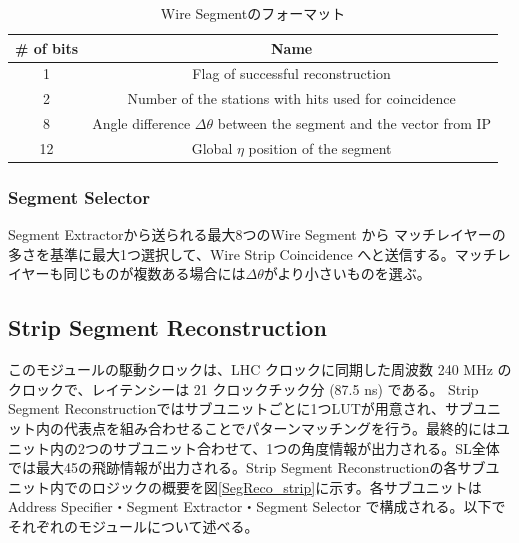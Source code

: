 \begin{table}[h]
    \centering
    \caption{Wire Segmentのフォーマット}
    \label{tab:WireSegment}
    \begin{tabular}{|c|c|}
    \hline
    \# of bits & Name                                                                       \\ \hline\hline
    1          & Flag of successful reconstruction                                          \\ \hline
    2          & Number of the stations with hits used for coincidence                      \\ \hline
    8          & Angle difference $\Delta\theta$ between the segment and the vector from IP \\ \hline
    12         & Global $\eta$ position of the segment                                      \\ \hline
    \end{tabular}
\end{table}

\subsubsection*{Segment Selector}
Segment Extractorから送られる最大8つのWire Segment から マッチレイヤーの多さを基準に最大1つ選択して、Wire Strip Coincidence へと送信する。マッチレイヤーも同じものが複数ある場合には$\Delta\theta$がより小さいものを選ぶ。

\subsection*{Strip Segment Reconstruction}
このモジュールの駆動クロックは、LHC クロックに同期した周波数 240 MHz のクロックで、レイテンシーは 21 クロックチック分 (87.5 ns) である。
Strip Segment Reconstructionではサブユニットごとに1つLUTが用意され、サブユニット内の代表点を組み合わせることでパターンマッチングを行う。最終的にはユニット内の2つのサブユニット合わせて、1つの角度情報が出力される。SL全体では最大45の飛跡情報が出力される。Strip Segment Reconstructionの各サブユニット内でのロジックの概要を図\ref{SegReco_strip}に示す。各サブユニットはAddress Specifier・Segment Extractor・Segment Selector で構成される。以下でそれぞれのモジュールについて述べる。

